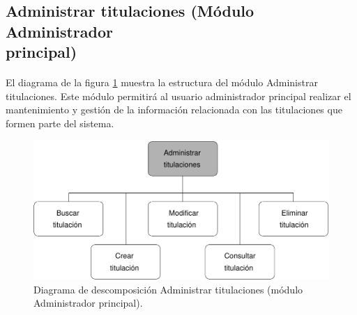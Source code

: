 \subsection{Administrar titulaciones (Módulo Administrador\\ principal)}

  \paragraph{}El diagrama de la figura
  \ref{diagramaDescomposicionAdministrarTitulaciones} muestra la estructura del
  módulo Administrar titulaciones. Este módulo permitirá al usuario
  administrador principal realizar el mantenimiento y gestión de la información
  relacionada con las titulaciones que formen parte del sistema.


  \begin{figure}[!ht]
    \begin{center}
      \includegraphics[]{11.Disenyo_Arquitectonico/11.2.Diagramas_Descomposicion/11.2.2.Modulo_administrador_principal/AdministrarBBDD/AdministrarTitulaciones/Diagramas/administrar_titulaciones.pdf}
      \caption{Diagrama de descomposición Administrar titulaciones (módulo Administrador principal).}
      \label{diagramaDescomposicionAdministrarTitulaciones}
    \end{center}
  \end{figure}
